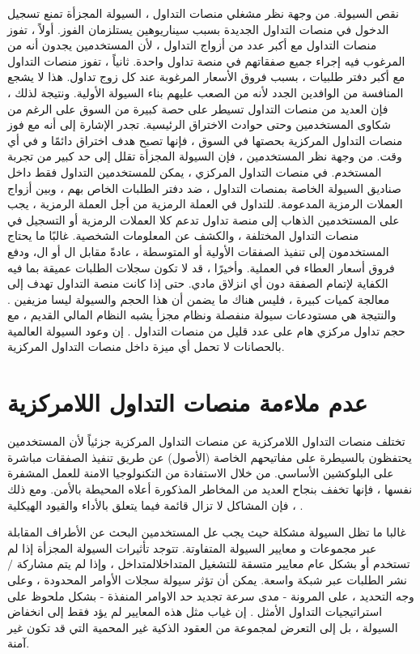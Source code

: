 \documentclass[12pt, a4paper, leqno]{report}
\theoremstyle{plain}
\theoremstyle{definition}
\begin{document}
\begin{multicols}{2}
\begin{otherlanguage}{arabic}
نقص السيولة. من وجهة نظر مشغلي منصات التداول  ، السيولة المجزأة تمنع تسجيل الدخول في منصات التداول الجديدة بسبب سيناريوهين يستلزمان الفوز. أولاً ، تفوز منصات التداول  مع أكبر عدد من أزواج التداول ، لأن المستخدمين يجدون أنه من المرغوب فيه إجراء جميع صفقاتهم في منصة تداول  واحدة. ثانياً ، تفوز منصات التداول  مع أكبر دفتر طلبيات ، بسبب فروق الأسعار المرغوبة عند كل زوج تداول. هذا لا يشجع المنافسة من الوافدين الجدد لأنه من الصعب عليهم بناء السيولة الأولية. ونتيجة لذلك ، فإن العديد من منصات التداول  تسيطر على حصة كبيرة من السوق على الرغم من شكاوى المستخدمين وحتى حوادث الاختراق الرئيسية. تجدر الإشارة إلى أنه مع فوز منصات التداول  المركزية بحصتها في السوق ، فإنها تصبح هدف اختراق دائمًا و في أي وقت. من وجهة نظر المستخدمين ، فإن السيولة المجزأة تقلل إلى حد كبير من تجربة المستخدم. في منصات التداول  المركزي ، يمكن للمستخدمين التداول فقط داخل صناديق السيولة الخاصة بمنصات التداول  ، ضد دفتر الطلبات الخاص بهم ، وبين أزواج العملات الرمزية المدعومة. للتداول في العملة الرمزية  من أجل العملة الرمزية  ، يجب على المستخدمين الذهاب إلى منصة تداول تدعم كلا العملات الرمزية أو التسجيل في منصات التداول  المختلفة ، والكشف عن المعلومات الشخصية. غالبًا ما يحتاج المستخدمون إلى تنفيذ الصفقات الأولية أو المتوسطة ، عادةً مقابل ال  أو ال، ودفع فروق أسعار العطاء في العملية. وأخيرًا ، قد لا تكون سجلات الطلبات عميقة بما فيه الكفاية لإتمام الصفقة دون أي انزلاق مادي. حتى إذا كانت منصة التداول  تهدف إلى معالجة كميات كبيرة ، فليس هناك ما يضمن أن هذا الحجم والسيولة ليسا مزيفين . والنتيجة هي مستودعات سيولة منفصلة ونظام مجزأ يشبه النظام المالي القديم ، مع حجم تداول مركزي هام على عدد قليل من منصات التداول . إن وعود السيولة العالمية بالحصانات لا تحمل أي ميزة داخل منصات التداول المركزية.
\end{otherlanguage}
\section{عدم ملاءمة منصات التداول اللامركزية }
\begin{otherlanguage}{arabic}
تختلف منصات التداول اللامركزية عن منصات التداول  المركزية جزئياً لأن المستخدمين يحتفظون بالسيطرة على مفاتيحهم الخاصة (الأصول) عن طريق تنفيذ الصفقات مباشرة على البلوكشين الأساسي. من خلال الاستفادة من التكنولوجيا الامنة للعمل المشفرة نفسها ، فإنها تخفف بنجاح العديد من المخاطر المذكورة أعلاه المحيطة بالأمن. ومع ذلك ، فإن المشاكل لا تزال قائمة فيما يتعلق بالأداء والقيود الهيكلية .

غالبا ما تظل السيولة مشكلة حيث يجب عل المستخدمين البحث عن الأطراف المقابلة عبر مجموعات و معايير السيولة المتفاوتة. تتوجد تأثيرات السيولة المجزأة إذا لم تستخدم  أو  بشكل عام معايير متسقة للتشغيل المتداخلالمتداخل ، وإذا لم يتم مشاركة $/$ نشر الطلبات عبر شبكة واسعة. يمكن أن تؤثر سيولة سجلات الأوامر المحدودة ، وعلى وجه التحديد ، على المرونة - مدى سرعة تجديد حد الاوامر المنفذة - بشكل ملحوظ على استراتيجيات التداول الأمثل . إن غياب مثل هذه المعايير لم يؤد فقط إلى انخفاض السيولة ، بل إلى التعرض لمجموعة من العقود الذكية غير المحمية التي قد تكون غير آمنة.


\end{otherlanguage}
\end{multicols}
\end{document}
